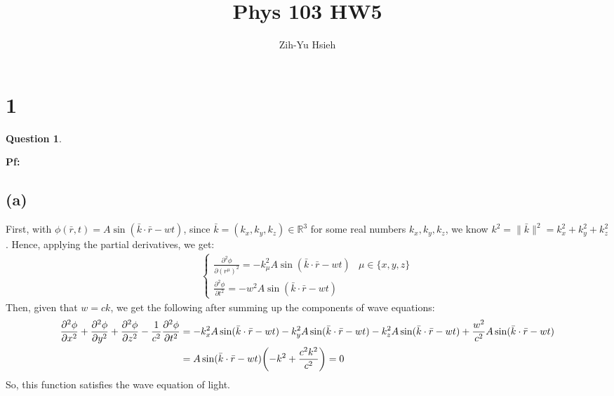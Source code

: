 \documentclass{article}
\title{Phys 103 HW5}
\author{Zih-Yu Hsieh}
\newtheorem{question}{Question}
\newcommand{\RR}{\mathbb{R}}
\DeclarePairedDelimiter{\paran}{(}{)}%
\begin{document}
\maketitle

\section*{1}
\begin{question}\label{q1}
\end{question}

\textbf{Pf:}
\subsection*{(a)}
First, with $\phi(\bar{r},t)=A\sin(\bar{k}\cdot \bar{r}-wt)$, since $\bar{k}=(k_x,k_y,k_z)\in\RR^3$ for some real numbers $k_x,k_y,k_z$, we know $k^2=\|\bar{k}\|^2 =k_x^2+k_y^2+k_z^2$. Hence, applying the partial derivatives, we get:
\begin{align}
    \begin{cases}
        \frac{\partial^2 \phi}{\partial (r^\mu)^2} = -k_\mu^2 A\sin(\bar{k}\cdot \bar{r}-wt) & \mu \in \{x,y,z\}\\
        \frac{\partial ^2\phi}{\partial t^2}=-w^2 A\sin(\bar{k}\cdot \bar{r}-wt)
    \end{cases}
\end{align}
Then, given that $w = ck$, we get the following after summing up the components of wave equations:
\begin{align}
    \frac{\partial^2\phi}{\partial x^2}+\frac{\partial^2\phi}{\partial y^2}+\frac{\partial^2\phi}{\partial z^2}-\frac{1}{c^2}\frac{\partial^2\phi}{\partial t^2} &= -k_x^2A\sin(\bar{k}\cdot \bar{r}-wt) -k_y^2A\sin(\bar{k}\cdot \bar{r}-wt)-k_z^2A\sin(\bar{k}\cdot \bar{r}-wt)+\frac{w^2}{c^2}A\sin(\bar{k}\cdot \bar{r}-wt)\\
    &= A\sin(\bar{k}\cdot \bar{r}-wt)\paran*{ -k^2 + \frac{c^2k^2}{c^2}} = 0
\end{align}
So, this function satisfies the wave equation of light.
\end{document}
